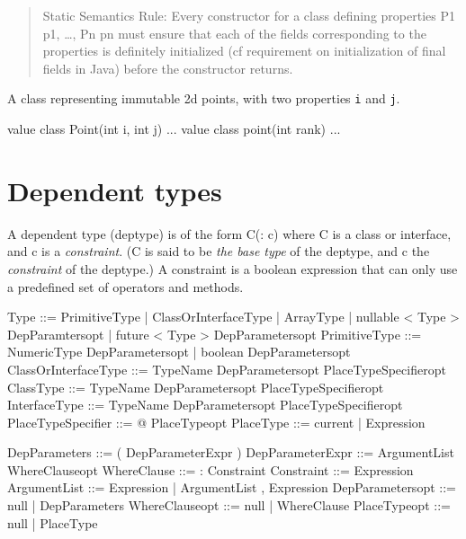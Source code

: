 \begin{quotation}
    {\sc Static Semantics Rule:}  Every constructor for a class defining
   properties {\cf P1 p1, \ldots, Pn pn} must ensure that each of the fields
   corresponding to the properties is definitely initialized (cf
   requirement on initialization of final fields in Java) before the
   constructor returns.  
\end{quotation}


\begin{example}
 A class representing immutable 2d points, with two properties {\tt i} and 
{\tt j}.
  \begin{x10}
   value class Point(int i, int j) { ... }
   value class point(int rank) { ... }
  \end{x10}
  
\end{example}

\section{Dependent types}\label{DepType:DepType}

A dependent type (deptype) is of the form {\cf C(: c)} where {\cf C} is a class
or interface, and {\cf c} is a {\em constraint}. ({\cf C} is said to be 
{\em the base type} of the deptype, and {\cf c} the {\em constraint} of the deptype.)  A
constraint is a boolean expression that can only use a predefined set
of operators and methods. 

\begin{x10}
Type  ::=   PrimitiveType
         | ClassOrInterfaceType
         | ArrayType
         | nullable < Type > DepParamtersopt
         | future < Type > DepParametersopt
PrimitiveType ::= NumericType DepParametersopt
         | boolean DepParametersopt
ClassOrInterfaceType   ::= 
  TypeName DepParametersopt PlaceTypeSpecifieropt
ClassType              ::= 
  TypeName DepParametersopt PlaceTypeSpecifieropt
InterfaceType          ::= 
  TypeName DepParametersopt PlaceTypeSpecifieropt
PlaceTypeSpecifier     ::=  @ PlaceTypeopt
PlaceType              ::= current | Expression

DepParameters    ::= ( DepParameterExpr ) 
DepParameterExpr ::= ArgumentList WhereClauseopt
WhereClause      ::= : Constraint
Constraint       ::= Expression
ArgumentList     ::= Expression 
   | ArgumentList , Expression
DepParametersopt ::= null | DepParameters
WhereClauseopt   ::= null | WhereClause
PlaceTypeopt     ::= null | PlaceType
\end{x10}

